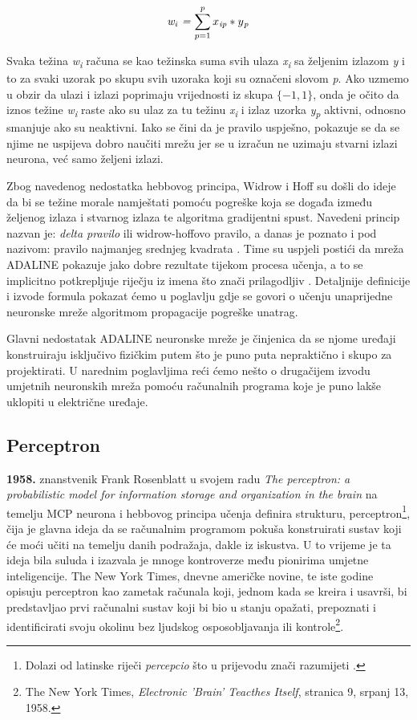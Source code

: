 \documentclass[times, utf8, zavrsni]{fer}
\begin{document}
\begin{equation}
    \textit{w\textsubscript{i} = $\sum\limits_{p = 1}^p x\textsubscript{ip} * y\textsubscript{p}$}
\end{equation}

Svaka težina \textit{w\textsubscript{i}} računa se kao težinska suma svih ulaza \textit{x\textsubscript{i}} sa željenim izlazom \textit{y} i to za svaki uzorak po skupu svih uzoraka koji su označeni slovom \textit{p}. Ako uzmemo u obzir da ulazi i izlazi poprimaju vrijednosti iz skupa $\{-1, 1\}$, onda je očito da iznos težine \textit{w\textsubscript{i}} raste ako su ulaz za tu težinu \textit{x\textsubscript{i}} i izlaz uzorka \textit{y\textsubscript{p}} aktivni, odnosno smanjuje ako su neaktivni. Iako se čini da je pravilo uspješno, pokazuje se da se njime ne uspijeva dobro naučiti mrežu jer se u izračun ne uzimaju stvarni izlazi neurona, već samo željeni izlazi.

Zbog navedenog nedostatka hebbovog principa, Widrow i Hoff su došli do ideje da bi se težine morale namještati pomoću pogreške  koja se događa između željenog izlaza i stvarnog izlaza te algoritma gradijentni spust. Navedeni princip nazvan je: \textit{delta pravilo}  ili widrow-hoffovo pravilo, a danas je poznato i pod nazivom: pravilo najmanjeg srednjeg kvadrata . Time su uspjeli postići da mreža ADALINE pokazuje jako dobre rezultate tijekom procesa učenja, a to se implicitno potkrepljuje riječju  iz imena što znači prilagodljiv \citep{picton2000}. Detaljnije definicije i izvode formula pokazat ćemo u poglavlju gdje se govori o učenju unaprijedne neuronske mreže algoritmom propagacije pogreške unatrag.

Glavni nedostatak ADALINE neuronske mreže je činjenica da se njome uređaji konstruiraju isključivo fizičkim putem što je puno puta nepraktično i skupo za projektirati. U narednim poglavljima reći ćemo nešto o drugačijem izvodu umjetnih neuronskih mreža pomoću računalnih programa koje je puno lakše uklopiti u električne uređaje.

\subsection{Perceptron}
\textbf{1958.} znanstvenik Frank Rosenblatt u svojem radu \textit{The perceptron: a probabilistic model for information storage and organization in the brain} na temelju MCP neurona i hebbovog principa učenja definira strukturu, perceptron\footnote{Dolazi od latinske riječi \textit{percepcio} što u prijevodu znači razumijeti .}, čija je glavna ideja da se računalnim programom pokuša konstruirati sustav koji će moći učiti na temelju danih podražaja, dakle iz iskustva. U to vrijeme je ta ideja bila suluda i izazvala je mnoge kontroverze među pionirima umjetne inteligencije. The New York Times, dnevne američke novine, te iste godine opisuju perceptron kao zametak  računala koji, jednom kada se kreira i usavrši, bi predstavljao prvi računalni sustav koji bi bio u stanju opažati, prepoznati i identificirati svoju okolinu bez ljudskog osposobljavanja ili kontrole\footnote{The New York Times, \textit{Electronic 'Brain' Teacthes Itself}, stranica 9, srpanj 13, 1958.}.
\end{document}
